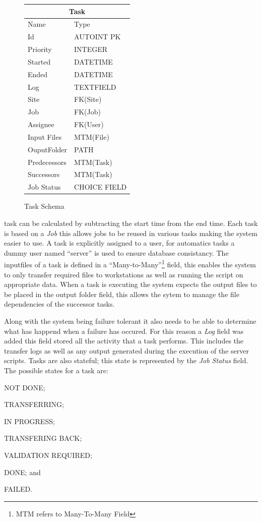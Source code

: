 \documentclass[12pt,a4paper]{report}
\begin{document}
\begin{figure}
\begin{tabular}{l|l}
    \multicolumn{2}{c}{Task} \\
    \hline
    Name        & Type \\
    \hline
    Id              & AUTOINT PK  \\
    Priority        & INTEGER  \\
    Started         & DATETIME \\
    Ended           & DATETIME \\
    Log             & TEXTFIELD \\
    Site            & FK(Site) \\
    Job             & FK(Job) \\
    Assignee        & FK(User) \\
    Input Files     & MTM(File) \\
    OuputFolder     & PATH \\
    Predecessors    & MTM(Task) \\
    Successors      & MTM(Task) \\
    Job Status      & CHOICE FIELD \\
\end{tabular}
\caption{Task Schema}
\end{figure}
\noindent task can be calculated by subtracting the start time from the end time. Each
task is based on a \emph{Job} this allows jobs to be reused in various tasks making the
system easier to use. A task is explicitly assigned to a user, for automatics tasks a
dummy user named ``server'' is used to ensure database consistancy. The inputfiles of
a task is defined in a ``Many-to-Many''\footnote{MTM refers to Many-To-Many Field}
field, this enables the system to only transfer
required files to workstations as well as running the script on appropriate data. When
a task is executing the system expects the output files to be placed in the output folder
field, this allows the sytem to manage the file dependencies of the successor tasks.

Along with the system being failure tolerant it also needs to be able to determine what
has happend when a failure has occured. For this reason a \emph{Log} field was added this
field stored all the activity that a task performs. This includes the transfer logs as
well as any output generated during the execution of the server scripts. Tasks are also
stateful; this state is represented by the \emph{Job Status} field. The possible states
for a task are:
\begin{inparaenum}[(i)]
\item NOT DONE;
\item TRANSFERRING;
\item IN PROGRESS;
\item TRANSFERING BACK;
\item VALIDATION REQUIRED;
\item DONE; and
\item FAILED.
\end{inparaenum}
\end{document}
